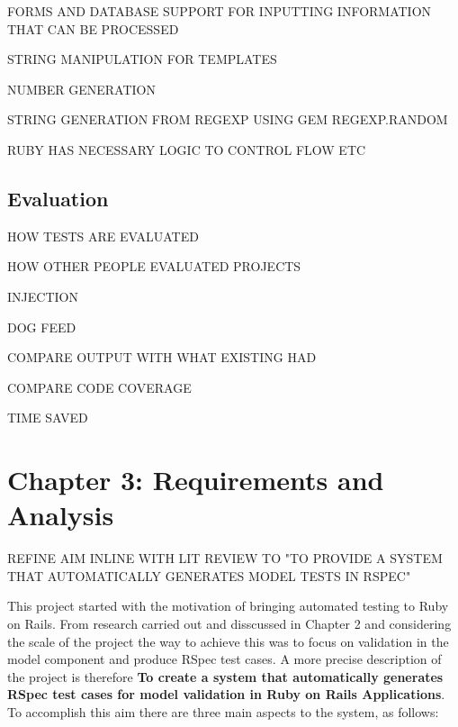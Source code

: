 \documentclass[a4paper,12pt]{article}
\begin{document}
\vspace{5mm}
\par FORMS AND DATABASE SUPPORT FOR INPUTTING INFORMATION THAT CAN BE PROCESSED
\vspace{5mm}
\par STRING MANIPULATION FOR TEMPLATES
\vspace{5mm}
\par NUMBER GENERATION
\vspace{5mm}
\par STRING GENERATION FROM REGEXP USING GEM REGEXP.RANDOM
\vspace{5mm}
\par RUBY HAS NECESSARY LOGIC TO CONTROL FLOW ETC


\subsection{Evaluation}
\par HOW TESTS ARE EVALUATED
\par HOW OTHER PEOPLE EVALUATED PROJECTS
\par INJECTION
\par DOG FEED
\par COMPARE OUTPUT WITH WHAT EXISTING HAD
\par COMPARE CODE COVERAGE
\par TIME SAVED


\newpage
\section{Chapter 3: Requirements and Analysis}
\par REFINE AIM INLINE WITH LIT REVIEW TO "TO PROVIDE A SYSTEM THAT AUTOMATICALLY GENERATES MODEL TESTS IN RSPEC"
\par This project started with the motivation of bringing automated testing to Ruby on Rails. From research carried out and disscussed in Chapter 2 and considering the scale of the project the way to achieve this was to focus on validation in the model component and produce RSpec test cases. A more precise description of the project is therefore \textbf{To create a system that automatically generates RSpec test cases for model validation in Ruby on Rails Applications}. To accomplish this aim there are three main aspects to the system, as follows:
\end{document}
